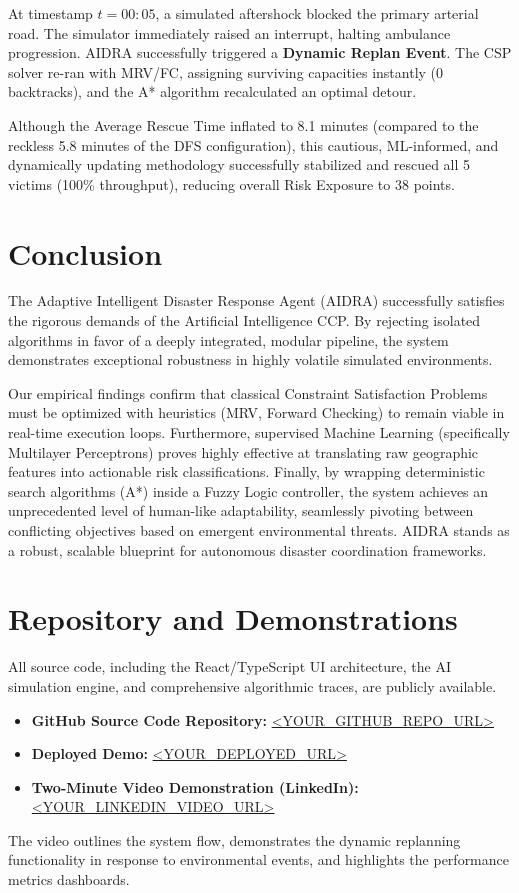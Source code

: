 \documentclass[conference]{IEEEtran}
\begin{document}
At timestamp $t=00:05$, a simulated aftershock blocked the primary arterial road. The simulator immediately raised an interrupt, halting ambulance progression. AIDRA successfully triggered a \textbf{Dynamic Replan Event}. The CSP solver re-ran with MRV/FC, assigning surviving capacities instantly (0 backtracks), and the A* algorithm recalculated an optimal detour. 

Although the Average Rescue Time inflated to 8.1 minutes (compared to the reckless 5.8 minutes of the DFS configuration), this cautious, ML-informed, and dynamically updating methodology successfully stabilized and rescued all 5 victims (100\% throughput), reducing overall Risk Exposure to 38 points.

\section{Conclusion}

The Adaptive Intelligent Disaster Response Agent (AIDRA) successfully satisfies the rigorous demands of the Artificial Intelligence CCP. By rejecting isolated algorithms in favor of a deeply integrated, modular pipeline, the system demonstrates exceptional robustness in highly volatile simulated environments.

Our empirical findings confirm that classical Constraint Satisfaction Problems must be optimized with heuristics (MRV, Forward Checking) to remain viable in real-time execution loops. Furthermore, supervised Machine Learning (specifically Multilayer Perceptrons) proves highly effective at translating raw geographic features into actionable risk classifications. Finally, by wrapping deterministic search algorithms (A*) inside a Fuzzy Logic controller, the system achieves an unprecedented level of human-like adaptability, seamlessly pivoting between conflicting objectives based on emergent environmental threats. AIDRA stands as a robust, scalable blueprint for autonomous disaster coordination frameworks.

\section*{Repository and Demonstrations}
All source code, including the React/TypeScript UI architecture, the AI simulation engine, and comprehensive algorithmic traces, are publicly available. 

\begin{itemize}
    \item \textbf{GitHub Source Code Repository:} \url{<YOUR_GITHUB_REPO_URL>}
    \item \textbf{Deployed Demo:} \url{<YOUR_DEPLOYED_URL>}
    \item \textbf{Two-Minute Video Demonstration (LinkedIn):} \url{<YOUR_LINKEDIN_VIDEO_URL>}
\end{itemize}
The video outlines the system flow, demonstrates the dynamic replanning functionality in response to environmental events, and highlights the performance metrics dashboards.
\end{document}
